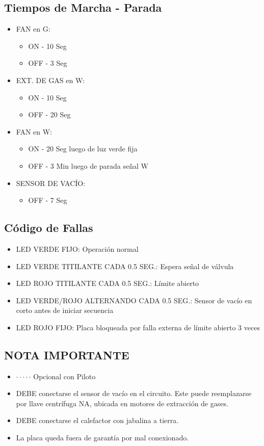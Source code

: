 \documentclass{article}
\begin{document}
\newpage

\subsection*{Tiempos de Marcha - Parada}
\begin{itemize}
\item FAN en G:
\begin{itemize}
\item ON - 10 Seg
\item OFF - 3 Seg
\end{itemize}

\item EXT. DE GAS en W:
\begin{itemize}
\item ON - 10 Seg
\item OFF - 20 Seg
\end{itemize}

\item FAN en W:
\begin{itemize}
\item ON - 20 Seg luego de luz verde fija
\item OFF - 3 Min luego de parada señal W
\end{itemize}

\item SENSOR DE VACÍO:
\begin{itemize}
\item OFF - 7 Seg
\end{itemize}
\end{itemize}

\subsection*{Código de Fallas}
\begin{itemize}
\item LED VERDE FIJO: Operación normal
\item LED VERDE TITILANTE CADA 0.5 SEG.: Espera señal de válvula
\item LED ROJO TITILANTE CADA 0.5 SEG.: Límite abierto
\item LED VERDE/ROJO ALTERNANDO CADA 0.5 SEG.: Sensor de vacío en corto antes de iniciar secuencia
\item LED ROJO FIJO: Placa bloqueada por falla externa de límite abierto 3 veces
\end{itemize}

\subsection*{NOTA IMPORTANTE}
\begin{itemize}
\item $\cdot \cdot \cdot \cdot \cdot$ Opcional con Piloto
\item DEBE conectarse el sensor de vacío en el circuito. Este puede reemplazarse por llave centrífuga NA, ubicada en motores de extracción de gases.
\item DEBE conectarse el calefactor con jabalina a tierra.
\item La placa queda fuera de garantía por mal conexionado.
\end{itemize}
\end{document}
